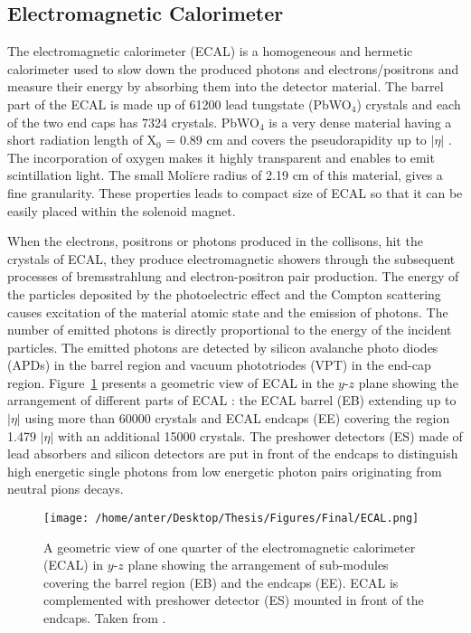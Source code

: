 \subsection{Electromagnetic Calorimeter}
The electromagnetic calorimeter (ECAL) is a homogeneous and hermetic calorimeter used to slow down the produced photons and electrons/positrons and measure their energy by absorbing them into the detector material. The barrel part of the ECAL is made up of 61200 lead tungstate (PbWO$_4$) crystals and each of the two end caps has 7324 crystals. PbWO$_4$ is a very dense material having a short radiation length of X$_0$ = 0.89 cm and covers the pseudorapidity up to $|\eta|$ . The incorporation of oxygen makes it highly transparent and enables to emit scintillation light. The small Moli$\grave{e}$re radius of 2.19 cm of this material, gives a fine granularity. These properties leads to compact size of ECAL so that it can be easily placed within the solenoid magnet. 

When the electrons, positrons or photons produced in the collisons, hit the crystals of ECAL, they produce electromagnetic showers through the subsequent processes of bremsstrahlung and electron-positron pair production. The energy of the particles deposited by the photoelectric effect and the Compton scattering causes excitation of the material atomic state and the emission of photons. The number of emitted photons is directly proportional to the energy of the incident particles. The emitted photons are detected by silicon avalanche photo diodes (APDs) in the barrel region and vacuum phototriodes (VPT) in the end-cap region. Figure~\ref{fig:ecal} presents a geometric view of ECAL in the $y$-$z$ plane showing the arrangement of different parts of ECAL : the ECAL barrel (EB) extending up to $|\eta|$  using more than 60000 crystals and ECAL endcaps (EE) covering the region 1.479 \ls $|\eta|$  with an additional 15000 crystals. The preshower detectors (ES) made of lead absorbers and silicon detectors are put in front of the endcaps to distinguish high energetic single photons from low energetic photon pairs originating from neutral pions decays.

\begin{figure}[!h]
\begin{center}
\vspace*{0mm} 
\hspace*{-5mm}
\texttt{[image: /home/anter/Desktop/Thesis/Figures/Final/ECAL.png]}\\
\vspace*{0mm}
\caption[A geometric view of one quarter of the electromagnetic calorimeter (ECAL) in $y$-$z$ plane.]{A geometric view of one quarter of the electromagnetic calorimeter (ECAL) in $y$-$z$ plane showing the arrangement of sub-modules covering the barrel region (EB) and the endcaps (EE). ECAL is complemented with preshower detector (ES) mounted in front of the endcaps. Taken from \cite{Bayatian:2006nff}.}
\label{fig:ecal}
\end{center}
\end{figure}

